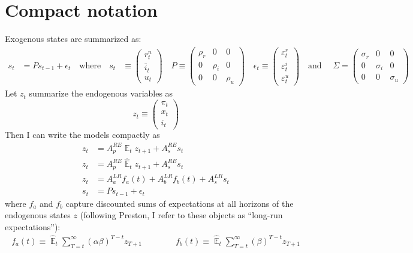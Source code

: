 \documentclass[11pt]{article}
\renewcommand{\[}{\begin{equation}}
\renewcommand{\]}{\end{equation}}
\DeclareMathOperator{\E}{\mathbb{E}}
\begin{document}
 \section{Compact notation}
Exogenous states are summarized as:
 \begin{align*}
 s_t & = P s_{t-1} + \epsilon_t 
 \quad \text{where} \quad 
 s_t & \equiv \begin{pmatrix} r_t^n \\ \bar{i}_t \\ u_t 
 \end{pmatrix} \quad 
 P  \equiv \begin{pmatrix} \rho_r & 0 & 0 \\ 0& \rho_i & 0 \\ 0&0& \rho_u 
 \end{pmatrix}  \quad 
 \epsilon_t \equiv \begin{pmatrix}\varepsilon_t^{r} \\ \varepsilon_t^{i}  \\ \varepsilon_t^{u} 
 \end{pmatrix}  \quad  \text{and } \quad \Sigma  =  \begin{pmatrix} \sigma_r & 0 & 0 \\ 0& \sigma_i & 0 \\ 0&0& \sigma_u 
 \end{pmatrix} 
 \end{align*}
 Let $z_t$ summarize the endogenous variables as
 \begin{equation}
 z_t \equiv \begin{pmatrix} \pi_t \\ x_t \\ i_t
 \end{pmatrix}
 \end{equation}
 Then I can write the models compactly as
 \begin{align}
z_t & = A_p^{RE} \E_t z_{t+1} + A_s^{RE} s_t \label{LOM_RE} \\
z_t & = A_p^{RE} \hat{\E}_t z_{t+1} + A_s^{RE} s_t \label{LOM_EE} \\
z_t & = A_a^{LR} f_a(t) + A_b^{LR} f_b(t) + A_s^{LR} s_t \label{LOM_LR} \\
s_t & = P s_{t-1} + \epsilon_t \label{exog}
\end{align}
 where $f_a$ and $f_b$ capture discounted sums of expectations at all horizons of the endogenous states $z$ (following Preston, I refer to these objects as ``long-run expectations''):
  \begin{align}
f_a(t)  \equiv  \hat{\E}_t\sum_{T=t}^{\infty} (\alpha\beta)^{T-t } z_{T+1} \quad \quad \quad \quad f_b(t)  \equiv \hat{\E}_t\sum_{T=t}^{\infty} (\beta)^{T-t } z_{T+1} \label{fafb}
\end{align}
\end{document}
